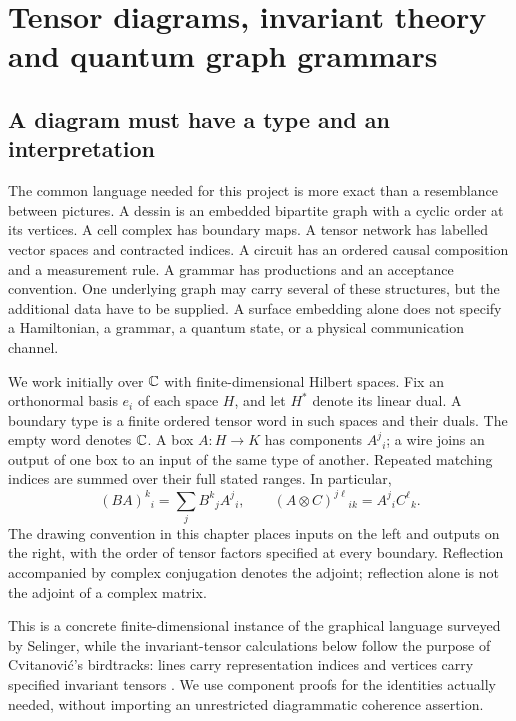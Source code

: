 \chapter{Tensor diagrams, invariant theory and quantum graph grammars}
\label{ch:tensor-grammars}

\section{A diagram must have a type and an interpretation}

The common language needed for this project is more exact than a resemblance between pictures. A dessin is an embedded bipartite graph with a cyclic order at its vertices. A cell complex has boundary maps. A tensor network has labelled vector spaces and contracted indices. A circuit has an ordered causal composition and a measurement rule. A grammar has productions and an acceptance convention. One underlying graph may carry several of these structures, but the additional data have to be supplied. A surface embedding alone does not specify a Hamiltonian, a grammar, a quantum state, or a physical communication channel.

We work initially over $\mathbb{C}$ with finite-dimensional Hilbert spaces. Fix an orthonormal basis $e_i$ of each space $H$, and let $H^*$ denote its linear dual. A boundary type is a finite ordered tensor word in such spaces and their duals. The empty word denotes $\mathbb{C}$. A box $A:H\to K$ has components $A^j{}_i$; a wire joins an output of one box to an input of the same type of another. Repeated matching indices are summed over their full stated ranges. In particular,
\[
 (BA)^k{}_i=\sum_j B^k{}_j A^j{}_i,
 \qquad
 (A\otimes C)^{j\ell}{}_{ik}=A^j{}_i C^\ell{}_k.
\]
The drawing convention in this chapter places inputs on the left and outputs on the right, with the order of tensor factors specified at every boundary. Reflection accompanied by complex conjugation denotes the adjoint; reflection alone is not the adjoint of a complex matrix.

This is a concrete finite-dimensional instance of the graphical language surveyed by Selinger, while the invariant-tensor calculations below follow the purpose of Cvitanovi\'c's birdtracks: lines carry representation indices and vertices carry specified invariant tensors \cite{TGselinger,TGbirdtracks}. We use component proofs for the identities actually needed, without importing an unrestricted diagrammatic coherence assertion.

